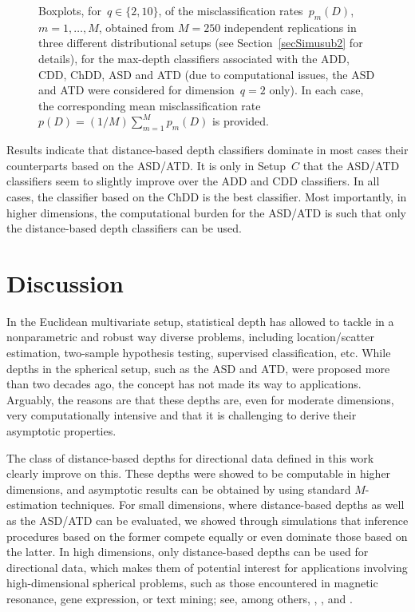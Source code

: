 \documentclass[usenames,dvipsnames]{article}
\begin{document}
\begin{figure}[h!] 
\captionsetup{font=scriptsize}
\begin{center}  
\end{center}
\vspace{-5mm}
\caption{Boxplots, for~$q\in\{2,10\}$, of the misclassification rates~$p_m(D)$, $m=1,\ldots,M$, obtained from $M=250$ independent replications in three different distributional setups (see Section~\ref{secSimusub2} for details), for the max-depth classifiers associated with the ADD, CDD, ChDD, ASD and ATD (due to computational issues, the ASD and ATD were considered for dimension~$q=2$ only). In each case, the corresponding mean misclassification rate~$p(D) = (1/M) \sum_{m=1}^M p_{m}(D)$ is provided.} 
\label{Classifig}
\end{figure}
 
Results indicate that distance-based depth classifiers dominate in most cases their counterparts based on the ASD/ATD. It is only in Setup~$C$ that the ASD/ATD classifiers seem to slightly improve over the ADD and CDD classifiers. In all cases, the classifier based on the ChDD is the best classifier. Most importantly, in higher dimensions, the computational burden for the ASD/ATD is such that only the distance-based depth classifiers can be used. 



\section{Discussion}
\label{secfinal}
 

In the Euclidean multivariate setup, statistical depth has allowed to tackle in a nonparametric and robust way diverse problems, including location/scatter estimation, two-sample hypothesis testing, supervised classification, etc. While depths in the spherical setup, such as the ASD and ATD, were proposed more than two decades ago, the concept has not made its way to applications. Arguably, the reasons are that these depths are, even for moderate dimensions, very computationally intensive and that it is challenging to derive their asymptotic properties.  

The class of distance-based depths for directional data defined in this work clearly improve on this. These depths were showed to be computable in higher dimensions, and asymptotic results can be obtained by using standard $M$-estimation techniques. For small dimensions, where distance-based depths as well as the ASD/ATD can be evaluated, we showed through simulations that inference procedures based on the former compete equally or even dominate those based on the latter. In high dimensions, only distance-based depths can be used for directional data, which makes them of potential interest for applications involving high-dimensional spherical problems, such as those encountered in magnetic resonance, gene expression, or text mining; see, among others, \cite{Dry2005}, \cite{banerjee2003generative}, and \cite{Banetal2005}. 
\end{document}
